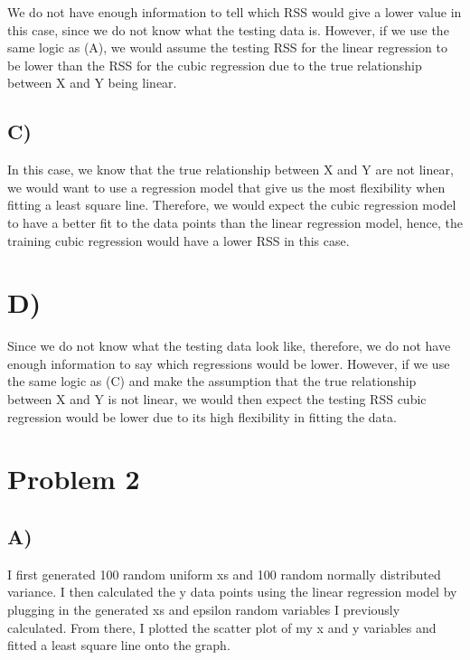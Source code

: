 \documentclass[11pt]{article}
\begin{document}
    We do not have enough information to tell which RSS would give a lower
value in this case, since we do not know what the testing data is.
However, if we use the same logic as (A), we would assume the testing
RSS for the linear regression to be lower than the RSS for the cubic
regression due to the true relationship between X and Y being linear.

    \hypertarget{c}{%
\subsection{C)}\label{c}}

    In this case, we know that the true relationship between X and Y are not
linear, we would want to use a regression model that give us the most
flexibility when fitting a least square line. Therefore, we would expect
the cubic regression model to have a better fit to the data points than
the linear regression model, hence, the training cubic regression would
have a lower RSS in this case.

    \hypertarget{d}{%
\section{D)}\label{d}}

    Since we do not know what the testing data look like, therefore, we do
not have enough information to say which regressions would be lower.
However, if we use the same logic as (C) and make the assumption that
the true relationship between X and Y is not linear, we would then
expect the testing RSS cubic regression would be lower due to its high
flexibility in fitting the data.

    \hypertarget{problem-2}{%
\section{Problem 2}\label{problem-2}}

    \hypertarget{a}{%
\subsection{A)}\label{a}}

    I first generated 100 random uniform xs and 100 random normally
distributed variance. I then calculated the y data points using the
linear regression model by plugging in the generated xs and epsilon
random variables I previously calculated. From there, I plotted the
scatter plot of my x and y variables and fitted a least square line onto
the graph.
\end{document}
